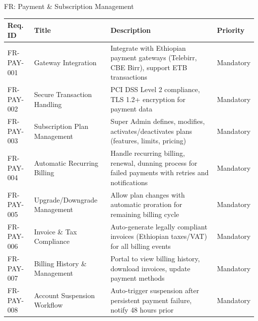 \begin{frame}{FR: Payment \& Subscription Management}
    \begin{table}[]
        \centering
        \tiny
        \begin{tabular}{|l|p{3cm}|p{5.5cm}|l|}
            \hline
            \textbf{Req. ID} & \textbf{Title} & \textbf{Description} & \textbf{Priority} \\
            \hline
            FR-PAY-001 & Gateway Integration & Integrate with Ethiopian payment gateways (Telebirr, CBE Birr), support ETB transactions & Mandatory \\
            \hline
            FR-PAY-002 & Secure Transaction Handling & PCI DSS Level 2 compliance, TLS 1.2+ encryption for payment data & Mandatory \\
            \hline
            FR-PAY-003 & Subscription Plan Management & Super Admin defines, modifies, activates/deactivates plans (features, limits, pricing) & Mandatory \\
            \hline
            FR-PAY-004 & Automatic Recurring Billing & Handle recurring billing, renewal, dunning process for failed payments with retries and notifications & Mandatory \\
            \hline
            FR-PAY-005 & Upgrade/Downgrade Management & Allow plan changes with automatic proration for remaining billing cycle & Mandatory \\
            \hline
            FR-PAY-006 & Invoice \& Tax Compliance & Auto-generate legally compliant invoices (Ethiopian taxes/VAT) for all billing events & Mandatory \\
            \hline
            FR-PAY-007 & Billing History \& Management & Portal to view billing history, download invoices, update payment methods & Mandatory \\
            \hline
            FR-PAY-008 & Account Suspension Workflow & Auto-trigger suspension after persistent payment failure, notify 48 hours prior & Mandatory \\
            \hline
        \end{tabular}
    \end{table}
\end{frame}

